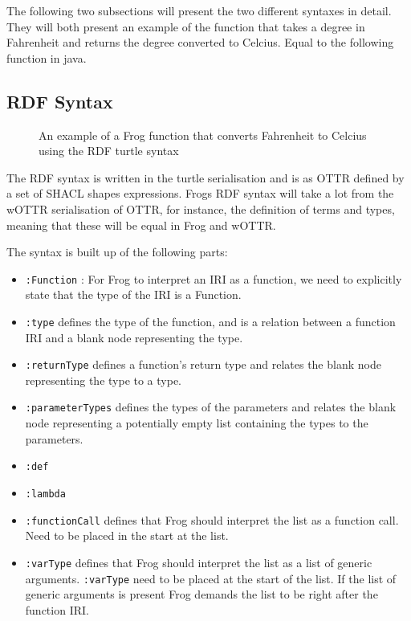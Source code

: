\para 
The following two subsections will present the two different syntaxes in detail. They will both present an example of the function that takes a degree in Fahrenheit and returns the degree converted to Celcius. Equal to the following function in java. 

\subsection{RDF Syntax}
\label{RDF_syntax}

\begin{figure}[b]
    
    \caption{An example of a Frog function that converts Fahrenheit to Celcius using the RDF turtle syntax}
    \label{fig:rdf_example}
\end{figure}

\para
The RDF syntax is written in the turtle serialisation and is as OTTR defined by a set of SHACL shapes expressions. Frogs RDF syntax will take a lot from the wOTTR serialisation of OTTR, for instance, the definition of terms and types, meaning that these will be equal in Frog and wOTTR. 

\para
The syntax is built up of the following parts: 

\begin{itemize}
    \item \lstinline{:Function} : For Frog to interpret an IRI as a function, we need to explicitly state that the type of the IRI is a Function. 
    \item \lstinline{:type} defines the type of the function, and is a relation between a function IRI and a blank node representing the type.
    \item \lstinline{:returnType} defines a function's return type and relates the blank node representing the type to a type. 
    \item \lstinline{:parameterTypes} defines the types of the parameters and relates the blank node representing a potentially empty list containing the types to the parameters.
    \item \lstinline{:def}
    \item \lstinline{:lambda}
    \item \lstinline{:functionCall} defines that Frog should interpret the list as a function call. Need to be placed in the start at the list. 
    \item \lstinline{:varType} defines that Frog should interpret the list as a list of generic arguments. \lstinline{:varType} need to be placed at the start of the list. If the list of generic arguments is present Frog demands the list to be right after the function IRI. 
  
\end{itemize}

